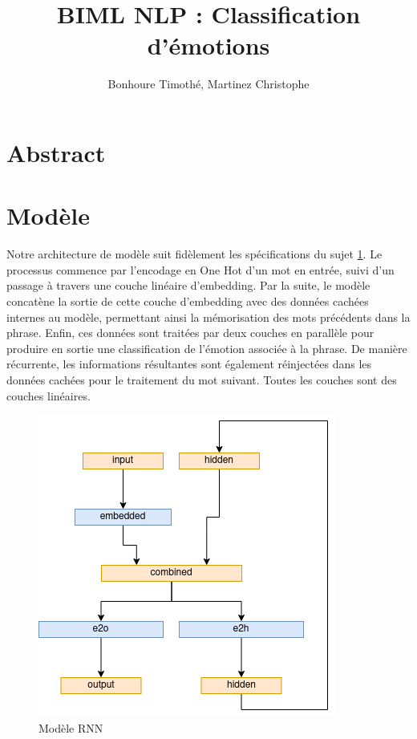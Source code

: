 \documentclass{article}
\begin{document}
\renewcommand{\arraystretch}{1.5}

\title{BIML NLP : Classification d'émotions \\
\footnotesize{}}
\author{Bonhoure Timothé, Martinez Christophe}                      %

\maketitle
\tableofcontents
\section*{Abstract}
\newpage

\section{Modèle}
Notre architecture de modèle suit fidèlement les spécifications du sujet \ref{fig:modele_rnn}. Le processus commence par l'encodage en One Hot d'un mot en entrée, suivi d'un passage à travers une couche linéaire d'embedding. Par la suite, le modèle concatène la sortie de cette couche d'embedding avec des données cachées internes au modèle, permettant ainsi la mémorisation des mots précédents dans la phrase. Enfin, ces données sont traitées par deux couches en parallèle pour produire en sortie une classification de l'émotion associée à la phrase. De manière récurrente, les informations résultantes sont également réinjectées dans les données cachées pour le traitement du mot suivant. Toutes les couches sont des couches linéaires.

\begin{figure}[H]
    \centering
    \includegraphics[width=0.4\linewidth]{img/modele.png}
    \caption{Modèle RNN}

    \label{fig:modele_rnn}
\end{figure}
\end{document}
